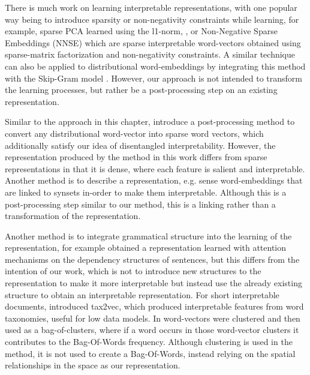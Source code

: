 There is much work on learning interpretable representations, with one popular way being to introduce sparsity or non-negativity constraints while learning, for example, sparse PCA learned using the l1-norm, \cite{H.Zou2006} \cite{Zhang2012},  or Non-Negative Sparse Embeddings (NNSE)  \cite{Murphy} which are sparse interpretable word-vectors obtained using sparse-matrix factorization and non-negativity constraints. A similar technique can also be applied to distributional word-embeddings by integrating this method with the Skip-Gram model \cite{Luo2015}. However, our approach is not intended to transform the learning processes, but rather be a post-processing step on an existing representation.

Similar to the approach in this chapter, \cite{Faruqui2015} introduce a post-processing method to convert any distributional word-vector into sparse word vectors, which additionally satisfy our idea of disentangled interpretability. However, the representation produced by the method in this work differs from sparse representations in that it is dense, where each feature is salient and interpretable. Another method is to describe a representation, e.g. sense word-embeddings that are linked to synsets \cite{Panchenko2016} in-order to make them interpretable. Although this is a post-processing step similar to our method, this is a linking rather than a transformation of the representation.  

Another method is to integrate grammatical structure into the learning of the representation, for example \cite{Liu2017} obtained a representation learned with attention mechanisms on the dependency structures of sentences, but this differs from the intention of our work, which is not to introduce new structures to the representation to make it more interpretable but instead use the already existing structure to obtain an interpretable representation. For short interpretable documents, \cite{Martinc} introduced tax2vec, which produced interpretable features from word taxonomies, useful for low data models. In \cite{Code} word-vectors were clustered and then used as a bag-of-clusters, where if a word occurs in those word-vector clusters it contributes to the Bag-Of-Words frequency. Although clustering is used in the method, it is not used to create a Bag-Of-Words, instead relying on the spatial relationships in the space as our representation. 


